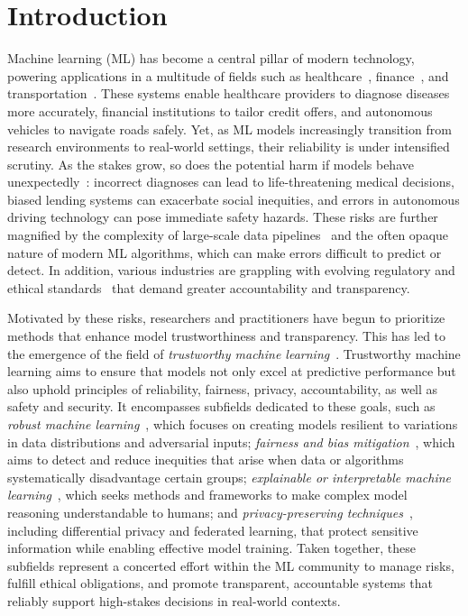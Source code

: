 \chapter{Introduction}
\label{ch:introduction}

\noindent Machine learning (ML) has become a central pillar of modern technology, powering applications in a multitude of fields such as healthcare~\citep{kotropoulos2009linear,sousa2009ordinal, challen2019artificial,guan2020bounded, mozannar2020consistent}, finance~\citep{9260038}, and transportation~\citep{ghodsi2021generating, tselentis2023usefulness}. These systems enable healthcare providers to diagnose diseases more accurately, financial institutions to tailor credit offers, and autonomous vehicles to navigate roads safely. Yet, as ML models increasingly transition from research environments to real-world settings, their reliability is under intensified scrutiny. As the stakes grow, so does the potential harm if models behave unexpectedly~\citep{amodei2016concrete, wiens2019no}: incorrect diagnoses can lead to life-threatening medical decisions, biased lending systems can exacerbate social inequities, and errors in autonomous driving technology can pose immediate safety hazards. These risks are further magnified by the complexity of large-scale data pipelines~\citep{pervaiz2019examining} and the often opaque nature of modern ML algorithms, which can make errors difficult to predict or detect. In addition, various industries are grappling with evolving regulatory and ethical standards~\citep{lo2020ethical, yaghini2024regulation} that demand greater accountability and transparency. 

Motivated by these risks, researchers and practitioners have begun to prioritize methods that enhance model trustworthiness and transparency. This has led to the emergence of the field of \textit{trustworthy machine learning}~\citep{li2023trustworthy}. Trustworthy machine learning aims to ensure that models not only excel at predictive performance but also uphold principles of reliability, fairness, privacy, accountability, as well as safety and security. It encompasses subfields dedicated to these goals, such as \textit{robust machine learning}~\citep{szegedy2013intriguing, papernot2017practical, rahimian2022frameworks}, which focuses on creating models resilient to variations in data distributions and adversarial inputs; \textit{fairness and bias mitigation}~\citep{hardt2016equality, mehrabi2021survey}, which aims to detect and reduce inequities that arise when data or algorithms systematically disadvantage certain groups; \textit{explainable or interpretable machine learning}~\citep{chen2019looks, rudin2019stop}, which seeks methods and frameworks to make complex model reasoning understandable to humans; and \textit{privacy-preserving techniques}~\citep{dwork2014algorithmic, abadi2016deep}, including differential privacy and federated learning, that protect sensitive information while enabling effective model training. Taken together, these subfields represent a concerted effort within the ML community to manage risks, fulfill ethical obligations, and promote transparent, accountable systems that reliably support high-stakes decisions in real-world contexts.


